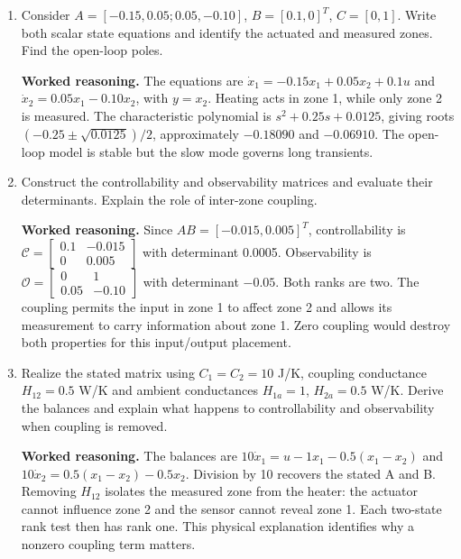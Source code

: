 \documentclass[10pt,a4paper]{article}
\newcommand{\answer}{\par\smallskip\textbf{Worked reasoning.} }
\begin{document}
\begin{enumerate}
\item Consider $A=[-0.15,0.05;0.05,-0.10]$, $B=[0.1,0]^T$, $C=[0,1]$. Write both scalar state equations and identify the actuated and measured zones. Find the open-loop poles.
\answer The equations are $\dot x_1=-0.15x_1+0.05x_2+0.1u$ and $\dot x_2=0.05x_1-0.10x_2$, with $y=x_2$. Heating acts in zone 1, while only zone 2 is measured. The characteristic polynomial is $s^2+0.25s+0.0125$, giving roots $(-0.25\pm\sqrt{0.0125})/2$, approximately $-0.18090$ and $-0.06910$. The open-loop model is stable but the slow mode governs long transients.
\item Construct the controllability and observability matrices and evaluate their determinants. Explain the role of inter-zone coupling.
\answer Since $AB=[-0.015,0.005]^T$, controllability is $\mathcal C=\begin{bmatrix}0.1&-0.015\\0&0.005\end{bmatrix}$ with determinant 0.0005. Observability is $\mathcal O=\begin{bmatrix}0&1\\0.05&-0.10\end{bmatrix}$ with determinant $-0.05$. Both ranks are two. The coupling permits the input in zone 1 to affect zone 2 and allows its measurement to carry information about zone 1. Zero coupling would destroy both properties for this input/output placement.
\item Realize the stated matrix using $C_1=C_2=10$ J/K, coupling conductance $H_{12}=0.5$ W/K and ambient conductances $H_{1a}=1$, $H_{2a}=0.5$ W/K. Derive the balances and explain what happens to controllability and observability when coupling is removed.
\answer The balances are $10\dot x_1=u-1x_1-0.5(x_1-x_2)$ and $10\dot x_2=0.5(x_1-x_2)-0.5x_2$. Division by 10 recovers the stated A and B. Removing $H_{12}$ isolates the measured zone from the heater: the actuator cannot influence zone 2 and the sensor cannot reveal zone 1. Each two-state rank test then has rank one. This physical explanation identifies why a nonzero coupling term matters.
\end{enumerate}
\end{document}
